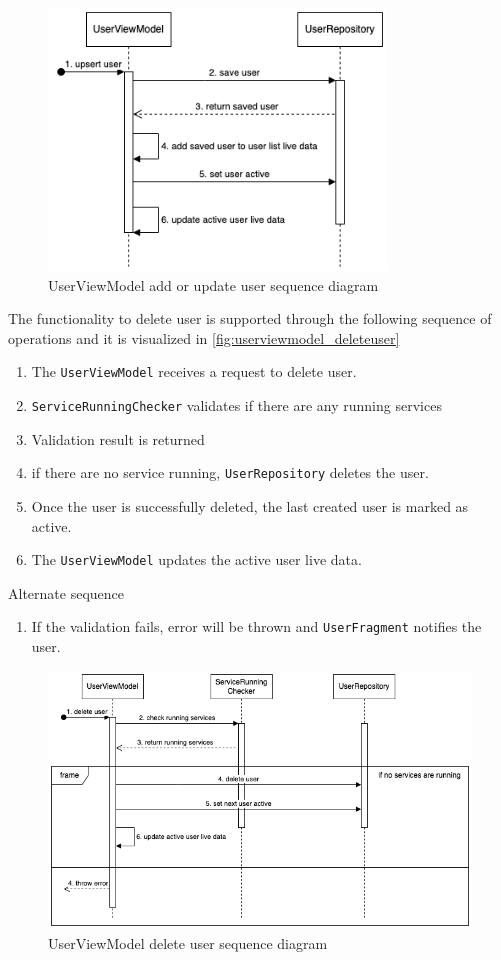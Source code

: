\begin{figure}[H]
    \centering
    \includegraphics[width=0.8\textwidth]{diagrams/upsert-user-vm.drawio.png}
    \caption{UserViewModel add or update user sequence diagram}
    \label{fig:userviewmodel_upsertuser}
\end{figure}

The functionality to delete user is supported through the following sequence of operations and it is visualized in \autoref{fig:userviewmodel_deleteuser}

\begin{enumerate}
    \item The \texttt{UserViewModel} receives a request to delete user.
    \item \texttt{ServiceRunningChecker} validates if there are any running services
    \item Validation result is returned
    \item if there are no service running, \texttt{UserRepository} deletes the user.
    \item Once the user is successfully deleted, the last created user is marked as active.
    \item The \texttt{UserViewModel} updates the active user live data.
\end{enumerate}

Alternate sequence
\begin{enumerate}[start=4]
    \item If the validation fails, error will be thrown and \texttt{UserFragment} notifies the user.
\end{enumerate}

\begin{figure}[H]
    \centering
    \includegraphics[width=1\textwidth]{diagrams/delete-user-vm.drawio.png}
    \caption{UserViewModel delete user sequence diagram}
    \label{fig:userviewmodel_deleteuser}
\end{figure}


